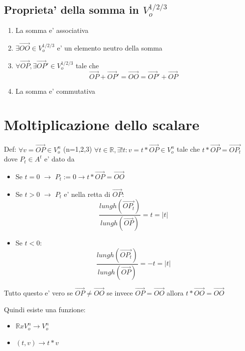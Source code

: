 \documentclass{article}
\begin{document}
\subsection{Proprieta' della somma in $V_o^{1/2/3}$}
\begin{enumerate}
	\item La somma e' associativa
	\item $\exists \overrightarrow{OO} \in V_o^{1/2/3}$ e' un elemento neutro della somma
	\item $\forall \overrightarrow{OP}, \exists \overrightarrow{OP}' \in V_o^{1/2/3}$ tale che
	      \begin{equation*}
		      \overrightarrow{OP} +\overrightarrow{OP}' = \overrightarrow{OO}=\overrightarrow{OP}' +\overrightarrow{OP}
	      \end{equation*}
	\item La somma e' commutativa
\end{enumerate}
\section{Moltiplicazione dello scalare}
\begin{flushleft}
	Def: $\forall v = \overrightarrow{OP} \in V_o^n$ (n=1,2,3)
	$\forall t \in \mathbb{R}, \exists !t: v=t*\overrightarrow{OP} \in V^n_o$ tale che
	$t*\overrightarrow{OP}=\overrightarrow{OP_t}$ dove $P_t \in A^t$ e' dato da
\end{flushleft}
\begin{itemize}
	\item Se $t=0$ $\to$ $P_t:= 0 \to t*\overrightarrow{OP}=\overrightarrow{OO}$
	\item Se $t>0$ $\to$ $P_t$ e' nella retta di $\overrightarrow{OP}$:
	      \begin{equation*}
		      \frac{lungh(\overrightarrow{OP_t})}{lungh(\overrightarrow{OP})} = t = |t|
	      \end{equation*}
	\item Se $t<0$:
	      \begin{equation*}
		      \frac{lungh(\overrightarrow{OP_t})}{lungh(\overrightarrow{OP})} = -t = |t|
	      \end{equation*}
\end{itemize}
\begin{flushleft}
	Tutto questo e' vero se $\overrightarrow{OP} \neq \overrightarrow{OO}$
	se invece $\overrightarrow{OP} = \overrightarrow{OO}$ allora $t*\overrightarrow{OO}=\overrightarrow{OO}$
\end{flushleft}
\begin{flushleft}
	Quindi esiste una funzione:
\end{flushleft}
\begin{itemize}
	\item $\mathbb{R}xV_o^n \to V_o^n$
	\item $(t,v) \to t*v$
\end{itemize}
\end{document}
